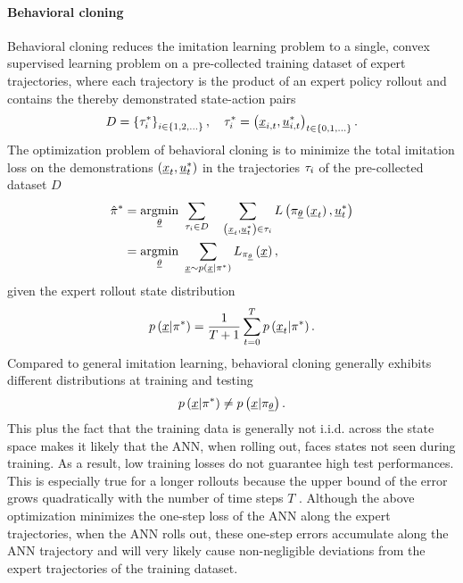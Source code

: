 \paragraph*{Behavioral cloning}$\ $\\
Behavioral cloning reduces the imitation learning problem 
to a single, convex supervised learning problem 
on a pre-collected training dataset 
of expert trajectories, where each trajectory is the product of an 
expert policy rollout and 
contains the thereby demonstrated state-action pairs
\begin{equation}
    D = \left\{{\tau_i^*}\right\}_{i \in \left\{{1, 2, \dots}\right\}}
    ,\quad
    \tau_i^* = \left({
        \underline{x}_{i,t}, \underline{u}_{i,t}^*}\right)
    _{t \in \left\{{0, 1, \dots}\right\}}.
\end{equation}
The optimization problem of behavioral cloning
is to minimize the 
total imitation loss on the demonstrations
$\left({\underline{x}_t, \underline{u}_t^*}\right)$ 
in the trajectories 
$\tau_i$
of the pre-collected dataset $D$
\begin{align}
    \hat{\pi}^*
    &=
    \underset{\underline{\theta}}{\mathrm{argmin}}\ 
    \sum_{\tau_i \in D} \quad
    \sum_{\left({\underline{x}_t, \underline{u}_t^*}\right) \in \tau_i
    }
    L \left({
        \pi_{\underline{\theta}} \left({\underline{x}_t}\right),
        \underline{u}_t^*
    }\right)
    \nonumber\\ &=
    \underset{\underline{\theta}}{\mathrm{argmin}}\ 
    \sum_{
        \underline{x} \sim p \left({
            \underline{x} | \pi^*}\right)
    }
    L_{\pi_{\underline{\theta}}} \left({\underline{x}}\right)
    ,
\end{align}
given the expert rollout state distribution
\begin{equation}
    p \left({\underline{x} | \pi^*}\right)
    = \frac{1}{T+1} \sum_{t = 0}^T
    p \left({\underline{x}_t | \pi^*}\right).
\end{equation}
Compared to general imitation learning, behavioral cloning 
generally exhibits different distributions at training and testing
\begin{equation}
    p \left({\underline{x} | \pi^*}\right)
    \neq 
    p \left({\underline{x} | \pi_{\underline{\theta}}}\right).
\end{equation}
This plus the fact that the training data is 
generally not i.i.d. across the state space 
makes it likely that the ANN, when rolling out, 
faces states not seen during training. 
As a result, low training losses do not guarantee high test performances. 
This is especially true for a longer rollouts 
because the upper bound of the error grows quadratically 
with the number of time steps $T$ \cite{yue2018imitation}. 
Although the above optimization minimizes 
the one-step loss of the ANN along the expert trajectories, 
when the ANN rolls out, these one-step errors accumulate 
along the ANN trajectory and will very likely 
cause non-negligible deviations from the expert trajectories 
of the training dataset.




